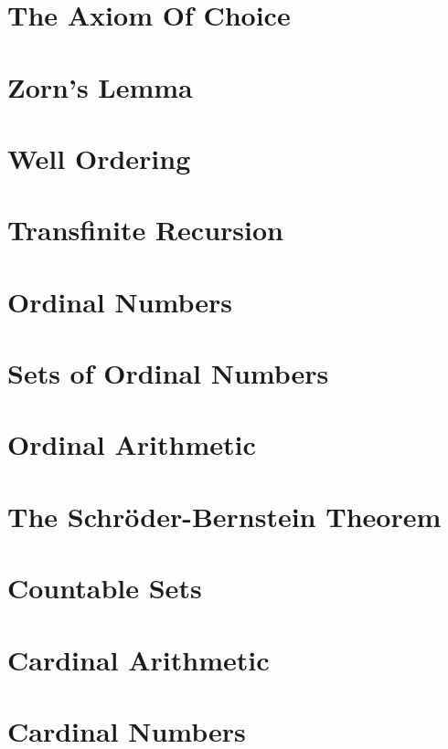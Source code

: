 \documentclass[fontsize=12pt,b5paper,
pagesize=auto]{book}
\theoremstyle{axiom}
\theoremstyle{exc}
\begin{document}
\chapter{The Axiom Of Choice}


\chapter{Zorn's Lemma}


\chapter{Well Ordering}


\chapter{Transfinite Recursion} 


\chapter{Ordinal Numbers}


\chapter{Sets of Ordinal Numbers}


\chapter{Ordinal Arithmetic}


\chapter{The Schröder-Bernstein Theorem}


\chapter{Countable Sets}


\chapter{Cardinal Arithmetic}


\chapter{Cardinal Numbers}


\printindex
\end{document}
